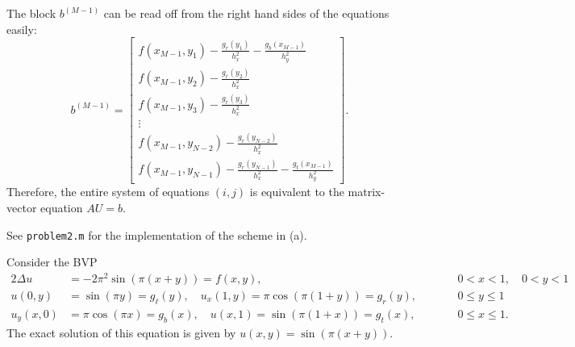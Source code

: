 \documentclass{homework}
\begin{document}
\begin{alphaparts}
\begin{equation*}
		\end{equation*}
		The block $b^{(M-1)}$ can be read off from the right hand sides of the equations easily:
		\begin{equation*}
			b^{(M-1)} = \left[\begin{matrix}
				f(x_{M-1},y_1) - \frac{g_r(y_1)}{h_x^2} - \frac{g_b(x_{M-1})}{h_y^2} \\
				f(x_{M-1},y_2) - \frac{g_r(y_2)}{h_x^2} \\
				f(x_{M-1},y_3) - \frac{g_r(y_3)}{h_x^2} \\
				\vdots \\
				f(x_{M-1},y_{N-2}) - \frac{g_r(y_{N-2})}{h_x^2}\\
				f(x_{M-1},y_{N-1}) - \frac{g_r(y_{N-1})}{h_x^2} - \frac{g_t(x_{M-1})}{h_y^2}
			\end{matrix}\right].
		\end{equation*}
		Therefore, the entire system of equations $(i,j)$ is equivalent to the matrix-vector equation $AU = b$.
		
		\questionpart See \texttt{problem2.m} for the implementation of the scheme in (a).
	\end{alphaparts}
	
	\question Consider the BVP
	\begin{alignat*}{2}
		\Delta u &= -2\pi^2\sin(\pi(x+y)) = f(x,y), &\qquad &0<x<1, \quad 0<y<1 \\
		u(0,y) &= \sin(\pi y) = g_\ell(y), \quad u_x(1, y) = \pi\cos(\pi(1+y)) = g_r(y), & \qquad &0 \le y \le 1\\
		u_y(x,0) &= \pi\cos(\pi x) = g_b(x), \quad u(x, 1) = \sin(\pi(1+x)) = g_t(x), & \qquad &0 \le x \le 1. 
	\end{alignat*}
	The exact solution of this equation is given by $u(x,y) = \sin(\pi(x+y))$.
	
\end{document}
